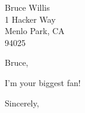 \documentclass[11pt]{letter}
\begin{document}
\begin{letter}{Bruce Willis \\ 1 Hacker Way \\ Menlo Park, CA \\ 94025}
    \opening{Bruce,}
    
    I'm your biggest fan!

    \closing{Sincerely,}

\end{letter}
\end{document}
